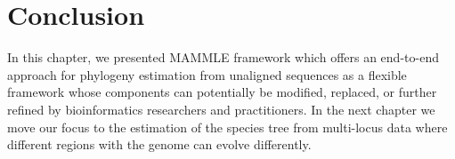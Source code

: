 
\section{Conclusion}
In this chapter, we presented MAMMLE framework which offers an end-to-end approach for phylogeny estimation from unaligned sequences as a flexible framework whose components can potentially be modified, replaced, or further refined by bioinformatics researchers and practitioners. In the next chapter we move our focus to the estimation of the species tree from multi-locus data where different regions with the genome can evolve differently.

